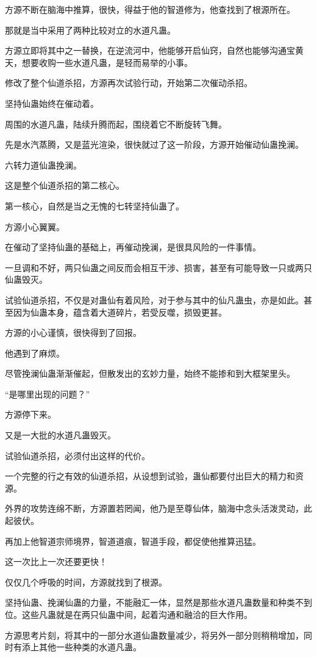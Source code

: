 \begin{this_body}
方源不断在脑海中推算，很快，得益于他的智道修为，他查找到了根源所在。

那就是当中采用了两种比较对立的水道凡蛊。

方源立即将其中之一替换，在逆流河中，他能够开启仙窍，自然也能够沟通宝黄天，想要收购一些水道凡蛊，是轻而易举的小事。

修改了整个仙道杀招，方源再次试验行动，开始第二次催动杀招。

坚持仙蛊始终在催动着。

周围的水道凡蛊，陆续升腾而起，围绕着它不断旋转飞舞。

先是水汽蒸腾，又是蓝光渲染，很快就过了这一阶段，方源开始催动仙蛊挽澜。

六转力道仙蛊挽澜。

这是整个仙道杀招的第二核心。

第一核心，自然是当之无愧的七转坚持仙蛊了。

方源小心翼翼。

在催动了坚持仙蛊的基础上，再催动挽澜，是很具风险的一件事情。

一旦调和不好，两只仙蛊之间反而会相互干涉、损害，甚至有可能导致一只或两只仙蛊毁灭。

试验仙道杀招，不仅是对蛊仙有着风险，对于参与其中的仙凡蛊虫，亦是如此。甚至因为仙蛊本身，蕴含着大道碎片，若受反噬，损毁更甚。

方源的小心谨慎，很快得到了回报。

他遇到了麻烦。

尽管挽澜仙蛊渐渐催起，但散发出的玄妙力量，始终不能掺和到大框架里头。

“是哪里出现的问题？”

方源停下来。

又是一大批的水道凡蛊毁灭。

试验仙道杀招，必须付出这样的代价。

一个完整的行之有效的仙道杀招，从设想到试验，蛊仙都要付出巨大的精力和资源。

外界的攻势连绵不断，方源置若罔闻，他乃是至尊仙体，脑海中念头活泼灵动，此起彼伏。

再加上他智道宗师境界，智道道痕，智道手段，都促使他推算迅猛。

这一次比上一次还要更快！

仅仅几个呼吸的时间，方源就找到了根源。

坚持仙蛊、挽澜仙蛊的力量，不能融汇一体，显然是那些水道凡蛊数量和种类不到位。这些凡蛊就是在两只仙蛊中间，起着沟通和融洽的巨大作用。

方源思考片刻，将其中的一部分水道仙蛊数量减少，将另外一部分则稍稍增加，同时有添上其他一些种类的水道凡蛊。


\end{this_body}
